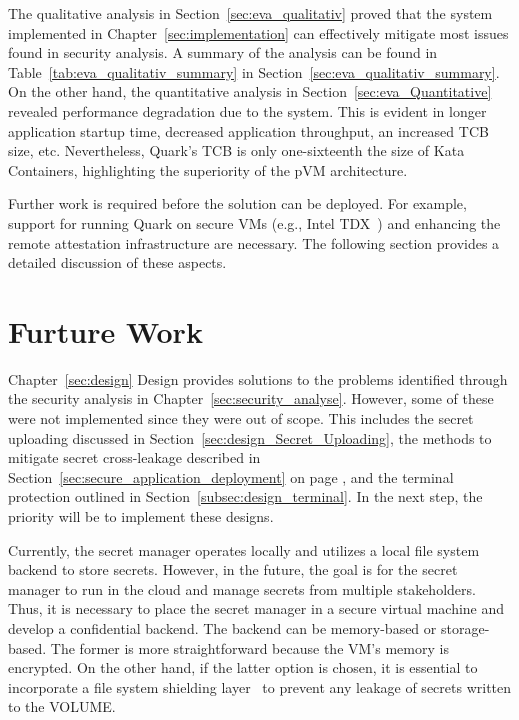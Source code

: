 The qualitative analysis in Section~\ref{sec:eva_qualitativ} proved that the system implemented in Chapter~\ref{sec:implementation} can effectively mitigate most issues found in security analysis. A summary of the analysis can be found in Table~\ref{tab:eva_qualitativ_summary} in Section~\ref{sec:eva_qualitativ_summary}. 
On the other hand, the quantitative analysis in Section~\ref{sec:eva_Quantitative} revealed performance degradation due to the system. This is evident in longer application startup time, 
decreased application throughput, an increased \acrshort{TCB} size, etc. Nevertheless, Quark's \acrshort{TCB} is only one-sixteenth the size of Kata Containers\cite*{Kata-Containers}, highlighting the superiority of the \acrshort{pVM} architecture. 
 
Further work is required before the solution can be deployed. For example, support for running Quark on secure VMs (e.g., Intel TDX~\cite*{Intel_tdx_whitepaper}) and enhancing the remote attestation infrastructure are necessary. The following section provides a detailed discussion of these aspects.


\section{Furture Work}

Chapter~\ref{sec:design} Design provides solutions to the problems identified through the security analysis in Chapter~\ref{sec:security_analyse}. However, some of these were not implemented since they were out of scope. This includes the secret uploading discussed in 
Section~\ref{sec:design_Secret_Uploading}, the methods to mitigate secret cross-leakage described in Section~\ref{sec:secure_application_deployment} on page \pageref{eq:1}, and the terminal protection outlined in Section~\ref{subsec:design_terminal}. In the next step, the 
priority will be to implement these designs.

Currently, the secret manager operates locally and utilizes a local file system backend to store secrets. However, in the future, the goal is for the secret manager to run in the cloud and manage secrets from multiple stakeholders. Thus, it is necessary to place the secret manager in 
a secure virtual machine and develop a confidential backend. The backend can be memory-based or storage-based. The former is more straightforward because the VM's memory is encrypted. On the other hand, if the latter option is chosen, it is essential to 
incorporate a file system shielding layer~\cite*{file_system_shield} to prevent any leakage of secrets written to the VOLUME.

